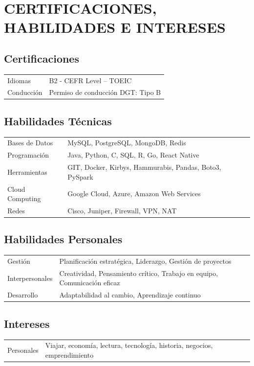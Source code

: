 \documentclass[a4paper,10pt]{article}
\begin{document}
	\section{CERTIFICACIONES, HABILIDADES E INTERESES}
	
	\subsection*{Certificaciones}
	\begin{tabularx}{\linewidth}{@{}l X@{}}
		Idiomas & B2 - CEFR Level – TOEIC \\
		Conducción & Permiso de conducción DGT: Tipo B \\
	\end{tabularx}
	
	\subsection*{Habilidades Técnicas}
	\begin{tabularx}{\linewidth}{@{}l X@{}}
		Bases de Datos & MySQL, PostgreSQL, MongoDB, Redis \\
		Programación & Java, Python, C, SQL, R, Go, React Native \\
		Herramientas & GIT, Docker, Kirbys, Hammurabis, Pandas, Boto3, PySpark \\
		Cloud Computing & Google Cloud, Azure, Amazon Web Services \\
		Redes & Cisco, Juniper, Firewall, VPN, NAT \\
	\end{tabularx}
	
	\subsection*{Habilidades Personales}
	\begin{tabularx}{\linewidth}{@{}l X@{}}
		Gestión & Planificación estratégica, Liderazgo, Gestión de proyectos \\
		Interpersonales & Creatividad, Pensamiento crítico, Trabajo en equipo, Comunicación eficaz \\
		Desarrollo & Adaptabilidad al cambio, Aprendizaje continuo \\
	\end{tabularx}
	
	\subsection*{Intereses}
	\begin{tabularx}{\linewidth}{@{}l X@{}}
		Personales & Viajar, economía, lectura, tecnología, historia, negocios, emprendimiento \\
	\end{tabularx}
	
	\vfill
	
\end{document}
